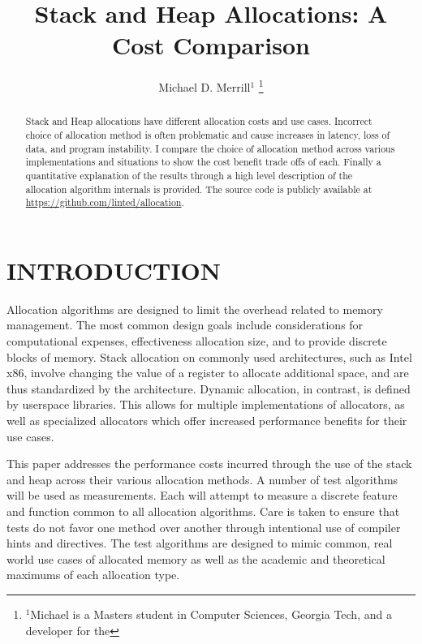 \documentclass[letterpaper, 10 pt, conference]{ieeeconf}  %
\title{\LARGE \bf
Stack and Heap Allocations: A Cost Comparison
}
\author{Michael D. Merrill$^{1}$%
\thanks{$^{1}$Michael is a Masters student in Computer Sciences, Georgia Tech,
and a developer for the  }%
}
\newcommand*\GitHubLoc{https://github.com/linted/allocation}
\begin{document}
\maketitle
\thispagestyle{empty}
\pagestyle{empty}


\begin{abstract}
Stack and Heap allocations have different allocation costs and use cases.
Incorrect choice of allocation method is often problematic and cause increases in latency,
loss of data, and program instability. I compare the choice of allocation method across various 
implementations and situations to show the cost benefit trade offs of each. 
Finally a quantitative explanation of the results through a high level description of the allocation algorithm internals is provided.
The source code is publicly available at \url{\GitHubLoc}.

\end{abstract}

\section{INTRODUCTION}

Allocation algorithms are designed to limit the overhead related to memory management.
The most common design goals include considerations for computational expenses, effectiveness allocation size, and to provide discrete blocks of memory. 
Stack allocation on commonly used architectures, such as Intel x86, involve changing the value of a register to allocate additional space, and are thus standardized by the architecture.
Dynamic allocation, in contrast, is defined by userspace libraries.
This allows for multiple implementations of allocators, as well as specialized allocators which offer increased performance benefits for their use cases. 

This paper addresses the performance costs incurred through the use of the stack and heap across their various allocation methods. 
A number of test algorithms will be used as measurements. 
Each will attempt to measure a discrete feature and function common to all allocation algorithms. 
Care is taken to ensure that tests do not favor one method over another through intentional use of compiler hints and directives. 
The test algorithms are designed to mimic common, real world use cases of allocated memory as well as the academic and theoretical maximums of each allocation type. 
\end{document}
